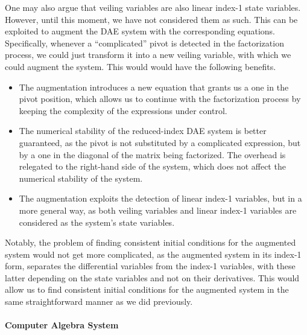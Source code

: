 One may also argue that veiling variables are also linear index-1 state variables. However, until this moment, we have not considered them as such. This can be exploited to augment the \ac{DAE} system with the corresponding equations. Specifically, whenever a ``complicated'' pivot is detected in the factorization process, we could just transform it into a new veiling variable, with which we could augment the system. This would would have the following benefits.
%
\begin{itemize}
  \setlength{\itemsep}{0pt}
  \item The augmentation introduces a new equation that grants us a one in the pivot position, which allows us to continue with the factorization process by keeping the complexity of the expressions under control.
  \item The numerical stability of the reduced-index \ac{DAE} system is better guaranteed, as the pivot is not substituted by a complicated expression, but by a one in the diagonal of the matrix being factorized. The overhead is relegated to the right-hand side of the system, which does not affect the numerical stability of the system.
  \item The augmentation exploits the detection of linear index-1 variables, but in a more general way, as both veiling variables and linear index-1 variables are considered as the system's state variables.
\end{itemize}

Notably, the problem of finding consistent initial conditions for the augmented system would not get more complicated, as the augmented system in its index-1 form, separates the differential variables from the index-1 variables, with these latter depending on the state variables and not on their derivatives. This would allow us to find consistent initial conditions for the augmented system in the same straightforward manner as we did previously.

\paragraph{Computer Algebra System}

